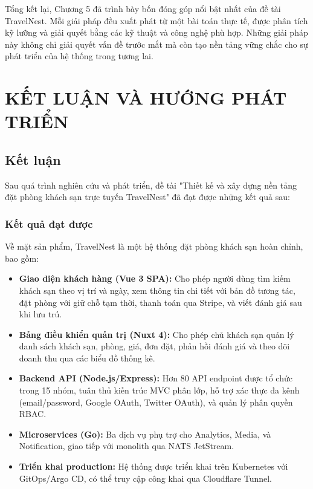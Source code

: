 \documentclass[13pt,a4paper,twoside]{report}
\begin{document}
Tổng kết lại, Chương 5 đã trình bày bốn đóng góp nổi bật nhất của đề tài TravelNest. Mỗi giải pháp đều xuất phát từ một bài toán thực tế, được phân tích kỹ lưỡng và giải quyết bằng các kỹ thuật và công nghệ phù hợp. Những giải pháp này không chỉ giải quyết vấn đề trước mắt mà còn tạo nền tảng vững chắc cho sự phát triển của hệ thống trong tương lai.


\chapter{KẾT LUẬN VÀ HƯỚNG PHÁT TRIỂN}

\section{Kết luận}

Sau quá trình nghiên cứu và phát triển, đề tài "Thiết kế và xây dựng nền tảng đặt phòng khách sạn trực tuyến TravelNest" đã đạt được những kết quả sau:

\subsection{Kết quả đạt được}

Về mặt sản phẩm, TravelNest là một hệ thống đặt phòng khách sạn hoàn chỉnh, bao gồm:

\begin{itemize}
  \item \textbf{Giao diện khách hàng (Vue 3 SPA):} Cho phép người dùng tìm kiếm khách sạn theo vị trí và ngày, xem thông tin chi tiết với bản đồ tương tác, đặt phòng với giữ chỗ tạm thời, thanh toán qua Stripe, và viết đánh giá sau khi lưu trú.
  \item \textbf{Bảng điều khiển quản trị (Nuxt 4):} Cho phép chủ khách sạn quản lý danh sách khách sạn, phòng, giá, đơn đặt, phản hồi đánh giá và theo dõi doanh thu qua các biểu đồ thống kê.
  \item \textbf{Backend API (Node.js/Express):} Hơn 80 API endpoint được tổ chức trong 15 nhóm, tuân thủ kiến trúc MVC phân lớp, hỗ trợ xác thực đa kênh (email/password, Google OAuth, Twitter OAuth), và quản lý phân quyền RBAC.
  \item \textbf{Microservices (Go):} Ba dịch vụ phụ trợ cho Analytics, Media, và Notification, giao tiếp với monolith qua NATS JetStream.
  \item \textbf{Triển khai production:} Hệ thống được triển khai trên Kubernetes với GitOps/Argo CD, có thể truy cập công khai qua Cloudflare Tunnel.
\end{itemize}
\end{document}
